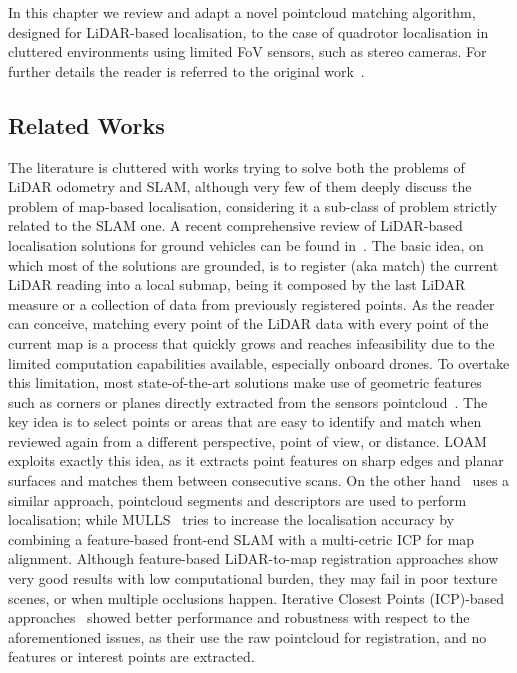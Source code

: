 In this chapter we review and adapt a novel pointcloud matching algorithm, designed for LiDAR-based localisation, to the case of
quadrotor localisation in cluttered environments using limited FoV sensors, such as stereo cameras.
For further details the reader is referred to the original work~\cite{caballero2021dll}.

\subsection{Related Works}
The literature is cluttered with works trying to solve both the problems of LiDAR odometry and SLAM, although
very few of them deeply discuss the problem of map-based localisation, considering it a sub-class of problem strictly related to the SLAM one.
A recent comprehensive review of LiDAR-based localisation solutions for ground vehicles can be found in~\cite{elhousni2020survey}.
The basic idea, on which most of the solutions are grounded, is to register (aka match) the current LiDAR reading into a local submap, being it
composed by the last LiDAR measure or a collection of data from previously registered points.
As the reader can conceive, matching every point of the LiDAR data with every point of the current map is a process that quickly grows and reaches
infeasibility due to the limited computation capabilities available, especially onboard drones.
To overtake this limitation, most state-of-the-art solutions make use of geometric features such as corners or planes directly extracted from the sensors
pointcloud~\cite{zhang2014loam, liu2019precise, choy2019fully}.
The key idea is to select points or areas that are easy to identify and match when reviewed again from a different perspective, point of view, or distance.
LOAM~\cite{zhang2014loam} exploits exactly this idea, as it extracts point features on sharp edges and planar surfaces and matches them between consecutive scans.
On the other hand~\cite{dube2018incremental} uses a similar approach, pointcloud segments and descriptors are used to perform localisation;
while MULLS~\cite{pan2021mulls} tries to increase the localisation accuracy by combining a feature-based front-end SLAM with a multi-cetric ICP for map alignment.
Although feature-based LiDAR-to-map registration approaches show very good results with low computational burden, they may fail in poor texture scenes, or
when multiple occlusions happen.
Iterative Closest Points (ICP)-based approaches~\cite{chen1992object} showed better performance and robustness with respect to the aforementioned issues,
as their use the raw pointcloud for registration, and no features or interest points are extracted.
